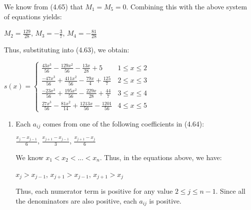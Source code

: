 \documentclass[12pt]{article}
\newenvironment{problem}[2][Problem]{\begin{trivlist}
\item[\hskip \labelsep {\bfseries #1}\hskip \labelsep {\bfseries #2.}]}{\end{trivlist}}
\begin{document}
We know from (4.65) that $M_1 = M_5 = 0$. Combining this with the above system of equations yields:
\begin{center}
$M_2 = \frac{129}{28}$, $M_3 = -\frac{3}{7}$, $M_4 = -\frac{81}{28}$
\end{center}
Thus, substituting into (4.63), we obtain:
\begin{center}
$s(x) = \begin{cases} 
      \frac{43x^3}{56} - \frac{129x^2}{56} - \frac{13x}{28} + 5 & 1 \leq x \leq 2 \\
      \frac{-47x^3}{56} + \frac{411x^2}{56} - \frac{79x}{4} + \frac{125}{7} & 2 \leq x \leq 3 \\
      \frac{-23x^3}{56} + \frac{195x^2}{56} - \frac{229x}{28} + \frac{44}{7} & 3 \leq x \leq 4\\
      \frac{27x^3}{56} - \frac{81x^2}{14} + \frac{1213x}{56} - \frac{1201}{56} & 4 \leq x \leq 5
   \end{cases}
$
\end{center}

\begin{problem}{5}
\end{problem}

\begin{enumerate}[\alph*)]
\item Each $a_{ij}$ comes from one of the following coefficients in (4.64):
\begin{center}
$\frac{x_j - x_{j-1}}{6}$, $\frac{x_{j+1} - x_{j-1}}{3}$, $\frac{x_{j+1} - x_j}{6}$
\end{center}

We know $x_1 < x_2 < ... < x_n$. Thus, in the equations above, we have:
\begin{center}
$x_j > x_{j-1}$, $x_{j+1} > x_{j-1}$, $x_{j+1} > x_j$
\end{center}

Thus, each numerator term is positive for any value $2 \leq j \leq n-1$. Since all the denominators are also positive, each $a_{ij}$ is positive.


\end{enumerate}
\end{document}
